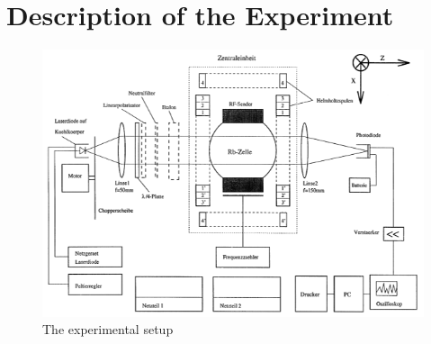 \section{Description of the Experiment}

\begin{figure}[H]
\centering\includegraphics[width=\textwidth]{BilderTheo/Aufbau.png}
\caption{The experimental setup}
\end{figure}

